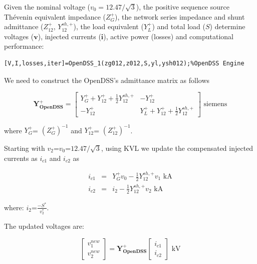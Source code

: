 \documentclass[12pt]{article}
\begin{document}
Given the nominal voltage ($v_0=12.47/\sqrt{3}$), the positive sequence source Th\'evenin equivalent impedance (${Z}^{+}_{G}$), the network series impedance and shunt admittance (${Z}^{+}_{12}$, ${Y}^{sh,+}_{12}$), the load equivalent (${Y}^{+}_{L}$) and total load (${S}$)
determine voltages ($\bm{v}$), injected currents ($\mathbf{i}$), active power (losses) and computational performance:

\begin{verbatim}
[V,I,losses,iter]=OpenDSS_1(zg012,z012,S,yl,ysh012);%OpenDSS Engine
\end{verbatim}

We need to construct the OpenDSS's admittance matrix as follows

\begin{equation}
\mathbf{Y^{+}_{OpenDSS}}=\left[ \begin{array}{cc}
               {Y}^{+}_{G}+{Y}^{+}_{12}+\frac{
1}{2}{Y}^{sh,+}_{12} &-{Y}^{+}_{12} \\
              -{Y}^{+}_{12}  & {Y}^{+}_{L}+{Y}^{+}_{12}+\frac{
1}{2}{Y}^{sh,+}_{12}
             \end{array}
           \right] \mbox{ siemens}\end{equation}

where  ${Y}^{+}_{G}$= $(Z^{+}_{G})^{-1}$ and
${Y}^{+}_{12}$= $(Z^{+}_{12})^{-1}$.

Starting with ${v}_2$=$v_0$=$12.47/\sqrt{3}$, using KVL we update the compensated injected currents as ${i}_{c1}$ and ${i}_{c2}$ as

\begin{eqnarray}
  {i}_{c1}&=&{Y}^{+}_{G}v_0-\frac{1}{2}{Y}^{sh,+}_{12}v_1\mbox{ kA}\\
    {i}_{c2}&=&{i}_{2}-\frac{1}{2}{Y}^{sh,+}_{12}v_2\mbox{ kA}
\end{eqnarray}

where:   ${i}_2$=$\frac{-{S}^*}{{v}^*_2}$.

The updated voltages are:

\begin{equation}
\begin{bmatrix}
	{v}^{new}_1\\
	{v}^{new}_2
\end{bmatrix}=
  \mathbf{{Y}^{+}_{OpenDSS}}
  \begin{bmatrix}
  {i}_{c1}\\
  {i}_{c2}\end{bmatrix}
    \mbox{ kV}
\end{equation}
\end{document}
